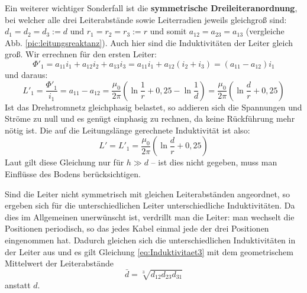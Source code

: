 Ein weiterer wichtiger Sonderfall ist die \textbf{symmetrische Dreileiteranordnung}, bei welcher alle drei Leiterabstände sowie Leiterradien jeweils gleichgroß sind: $d_1=d_2=d_3:=d$ und $r_1=r_2=r_3:=r$ und somit $a_{12}=a_{23}=a_{13}$ (vergleiche Abb. \ref{pic:leitungsreaktanz}). Auch hier sind die Induktivitäten der Leiter gleich groß. Wir errechnen für den ersten Leiter:
\begin{equation}
\Phi'_1 = a_{11}i_1+a_{12}i_2+a_{13}i_3 = a_{11}i_1+a_{12}\left(i_2+i_3\right) = \left(a_{11}-a_{12}\right)i_1
\end{equation}
und daraus:
\begin{equation}
L'_1 = \frac{\Phi'_1}{i_1} = a_{11}-a_{12} = \frac{\mu_0}{2\pi}\left(\ln\frac{1}{r}+0,25-\ln\frac{1}{d} \right) =
\frac{\mu_0}{2\pi}\left(\ln\frac{d}{r}+0,25 \right)
\end{equation}
Ist das Drehstromnetz gleichphasig belastet, so addieren sich die Spannungen und Ströme zu null und es genügt einphasig zu rechnen, da keine Rückführung mehr nötig ist. Die auf die Leitungslänge gerechnete Induktivität ist also:
\begin{equation}\label{eq:Induktivitaet3}
L' = L'_1 = \frac{\mu_0}{2\pi}\left(\ln\frac{d}{r}+0,25 \right)
\end{equation}
Laut \cite{Harrison} gilt diese Gleichung nur für $h\gg d$ – ist dies nicht gegeben, muss man Einflüsse des Bodens berücksichtigen.

Sind die Leiter nicht symmetrisch mit gleichen Leiterabständen angeordnet, so ergeben sich für die unterschiedlichen Leiter unterschiedliche Induktivitäten. Da dies im Allgemeinen unerwünscht ist, verdrillt man die Leiter: man wechselt die Positionen periodisch, so das jedes Kabel einmal jede der drei Positionen eingenommen hat. Dadurch gleichen sich die unterschiedlichen Induktivitäten in der Leiter aus und es gilt Gleichung \eqref{eq:Induktivitaet3} mit dem geometrischem Mittelwert der Leiterabstände
\begin{equation}
\bar{d} = \sqrt[3]{d_{12}d_{23}d_{31}}
\end{equation}
anstatt $d$.

